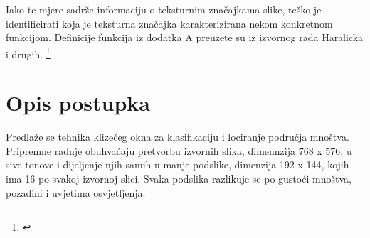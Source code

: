 \documentclass[times, utf8, zavrsni]{fer}
\begin{document}
\bigbreak

Iako te mjere sadrže informaciju o teksturnim značajkama slike, teško je identificirati koja je teksturna 
značajka karakterizirana nekom konkretnom funkcijom. Definicije funkcija iz dodatka A
preuzete su iz izvornog rada Haralicka i drugih. \footnote{\cite{haralick}}

\chapter{Opis postupka}

Predlaže se tehnika klizećeg okna za klasifikaciju i lociranje područja
mnoštva. Pripremne radnje obuhvaćaju pretvorbu izvornih slika, dimennzija
768 x 576, u sive tonove i dijeljenje njih samih u manje podslike, dimenzija
192 x 144, kojih ima 16 po svakoj izvornoj slici. Svaka podslika razlikuje se 
po gustoći mnoštva, pozadini i uvjetima osvjetljenja.  
\end{document}
